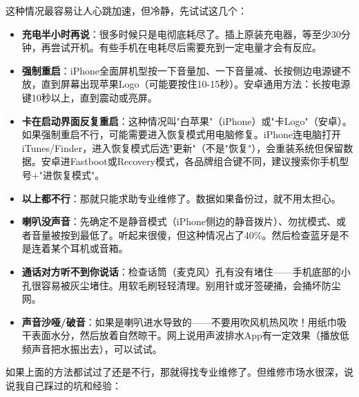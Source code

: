 
这种情况最容易让人心跳加速，但冷静，先试试这几个：

\begin{itemize}
  \item \textbf{充电半小时再说}：很多时候只是电彻底耗尽了。插上原装充电器，等至少30分钟，再尝试开机。有些手机在电耗尽后需要充到一定电量才会有反应。
  \item \textbf{强制重启}：iPhone全面屏机型按一下音量加、一下音量减、长按侧边电源键不放，直到屏幕出现苹果Logo（可能要按住10-15秒）。安卓通用方法：长按电源键10秒以上，直到震动或亮屏。
  \item \textbf{卡在启动界面反复重启}：这种情况叫"白苹果"（iPhone）或"卡Logo"（安卓）。如果强制重启不行，可能需要进入恢复模式用电脑修复。iPhone连电脑打开iTunes/Finder，进入恢复模式后选"更新"（不是"恢复"），会重装系统但保留数据。安卓进Fastboot或Recovery模式，各品牌组合键不同，建议搜索你手机型号+"进恢复模式"。
  \item \textbf{以上都不行}：那就只能求助专业维修了。数据如果备份过，就不用太担心。
\end{itemize}


\begin{itemize}
  \item \textbf{喇叭没声音}：先确定不是静音模式（iPhone侧边的静音拨片）、勿扰模式、或者音量被按到最低了。听起来很傻，但这种情况占了40\%。然后检查蓝牙是不是连着某个耳机或音箱。
  \item \textbf{通话对方听不到你说话}：检查话筒（麦克风）孔有没有堵住——手机底部的小孔很容易被灰尘堵住。用软毛刷轻轻清理。别用针或牙签硬捅，会捅坏防尘网。
  \item \textbf{声音沙哑/破音}：如果是喇叭进水导致的——不要用吹风机热风吹！用纸巾吸干表面水分，然后放着自然晾干。网上说用声波排水App有一定效果（播放低频声音把水振出去），可以试试。
\end{itemize}


如果上面的方法都试过了还是不行，那就得找专业维修了。但维修市场水很深，说说我自己踩过的坑和经验：

